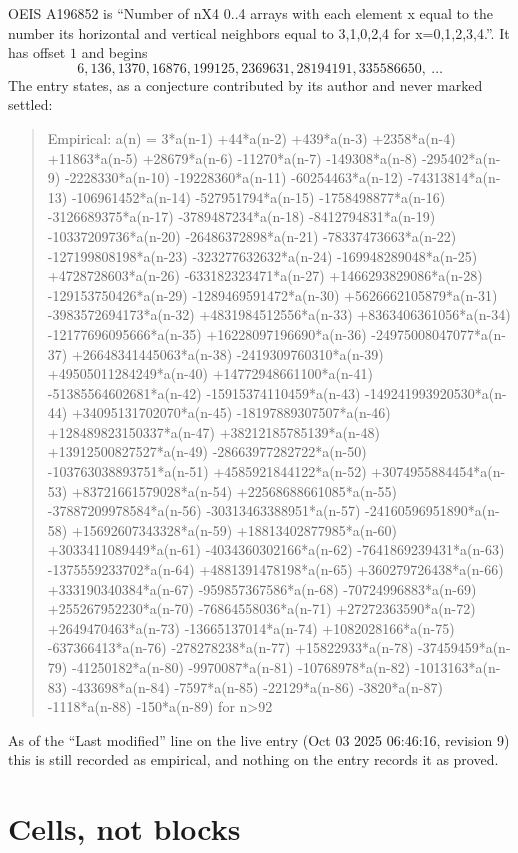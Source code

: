 \documentclass[11pt,a4paper]{article}
\theoremstyle{plain}
\theoremstyle{definition}
\begin{document}
OEIS A196852 is ``Number of nX4 0..4 arrays with each element x equal to the number its horizontal and vertical neighbors equal to 3,1,0,2,4 for x=0,1,2,3,4.''. It has offset $1$ and begins
\[
6, 136, 1370, 16876, 199125, 2369631, 28194191, 335586650,\ \dots
\]
The entry states, as a conjecture contributed by its author and never marked settled:
\begin{quote}
Empirical: a(n) = 3*a(n-1) +44*a(n-2) +439*a(n-3) +2358*a(n-4) +11863*a(n-5) +28679*a(n-6) -11270*a(n-7) -149308*a(n-8) -295402*a(n-9) -2228330*a(n-10) -19228360*a(n-11) -60254463*a(n-12) -74313814*a(n-13) -106961452*a(n-14) -527951794*a(n-15) -1758498877*a(n-16) -3126689375*a(n-17) -3789487234*a(n-18) -8412794831*a(n-19) -10337209736*a(n-20) -26486372898*a(n-21) -78337473663*a(n-22) -127199808198*a(n-23) -323277632632*a(n-24) -169948289048*a(n-25) +4728728603*a(n-26) -633182323471*a(n-27) +1466293829086*a(n-28) -129153750426*a(n-29) -1289469591472*a(n-30) +5626662105879*a(n-31) -3983572694173*a(n-32) +4831984512556*a(n-33) +8363406361056*a(n-34) -12177696095666*a(n-35) +16228097196690*a(n-36) -24975008047077*a(n-37) +26648341445063*a(n-38) -2419309760310*a(n-39) +49505011284249*a(n-40) +14772948661100*a(n-41) -51385564602681*a(n-42) -15915374110459*a(n-43) -149241993920530*a(n-44) +34095131702070*a(n-45) -18197889307507*a(n-46) +128489823150337*a(n-47) +38212185785139*a(n-48) +13912500827527*a(n-49) -28663977282722*a(n-50) -103763038893751*a(n-51) +4585921844122*a(n-52) +3074955884454*a(n-53) +83721661579028*a(n-54) +22568688661085*a(n-55) -37887209978584*a(n-56) -30313463388951*a(n-57) -24160596951890*a(n-58) +15692607343328*a(n-59) +18813402877985*a(n-60) +3033411089449*a(n-61) -4034360302166*a(n-62) -7641869239431*a(n-63) -1375559233702*a(n-64) +4881391478198*a(n-65) +360279726438*a(n-66) +333190340384*a(n-67) -959857367586*a(n-68) -70724996883*a(n-69) +255267952230*a(n-70) -76864558036*a(n-71) +27272363590*a(n-72) +2649470463*a(n-73) -13665137014*a(n-74) +1082028166*a(n-75) -637366413*a(n-76) -278278238*a(n-77) +15822933*a(n-78) -37459459*a(n-79) -41250182*a(n-80) -9970087*a(n-81) -10768978*a(n-82) -1013163*a(n-83) -433698*a(n-84) -7597*a(n-85) -22129*a(n-86) -3820*a(n-87) -1118*a(n-88) -150*a(n-89) for n>92
\end{quote}
As of the ``Last modified'' line on the live entry (Oct 03 2025 06:46:16, revision 9) this is still
recorded as empirical, and nothing on the entry records it as proved.

\section{Cells, not blocks}
\end{document}
